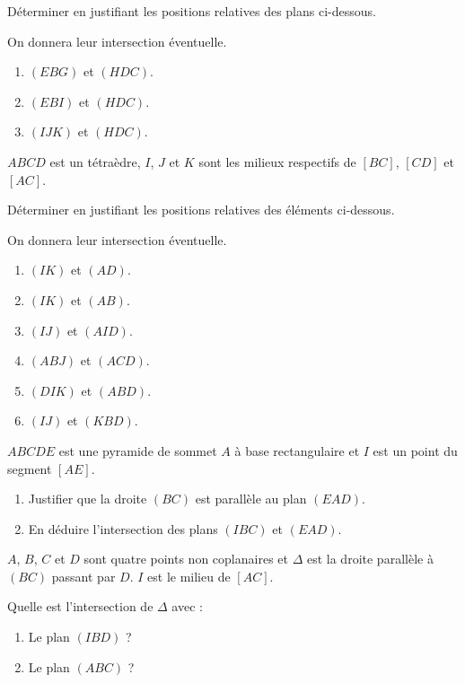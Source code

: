 \documentclass{cornouaille}
\begin{document}
\begin{exercice}
  Déterminer en justifiant les positions relatives des plans
  ci-dessous. 

  On donnera leur intersection éventuelle.
  \begin{enumerate}
  \item $(EBG)$ et $(HDC)$.
  \item $(EBI)$ et $(HDC)$.
  \item $(IJK)$ et $(HDC)$.
  \end{enumerate}
\end{exercice}

\begin{exercice}
  $ABCD$ est un tétraèdre, $I$, $J$ et $K$ sont les milieux respectifs
  de $[BC]$, $[CD]$ et $[AC]$.

  Déterminer en justifiant les positions relatives des éléments
  ci-dessous. 

  On donnera leur intersection éventuelle.
  \begin{enumerate}
  \item $(IK)$ et $(AD)$.
  \item $(IK)$ et $(AB)$.
  \item $(IJ)$ et $(AID)$.
  \item $(ABJ)$ et $(ACD)$.
  \item $(DIK)$ et $(ABD)$.
  \item $(IJ)$ et $(KBD)$.
  \end{enumerate}
\end{exercice}

\begin{exercice}
  $ABCDE$ est une pyramide de sommet $A$ à base rectangulaire et $I$
  est un point du segment $[AE]$.
  \begin{enumerate}
  \item Justifier que la droite $(BC)$ est parallèle au plan $(EAD)$.
  \item En déduire l'intersection des plans $(IBC)$ et $(EAD)$.
  \end{enumerate}
\end{exercice}

\begin{exercice}
  $A$, $B$, $C$ et $D$ sont quatre points non coplanaires et $\Delta$
  est la droite parallèle à $(BC)$ passant par $D$. $I$ est le milieu
  de $[AC]$.

  Quelle est l'intersection de $\Delta$ avec :
  \begin{enumerate}
  \item Le plan $(IBD)$ ?
  \item Le plan $(ABC)$ ?
  \end{enumerate}
\end{exercice}
\end{document}

